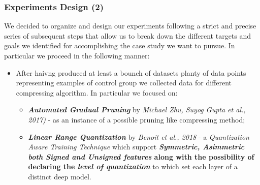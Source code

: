 



\begin{frame}
\frametitle{Experiments Design (2)}
We decided to organize and design our experiments following a strict and precise series of subsequent steps that allow us to break down the different targets and goals
we identified for accomplishing the case study we want to pursue. In particular we proceed in the following manner:

\begin{itemize}
\item After haivng produced at least a bounch of datasets planty of data points representing examples of control group we collected data for different compressing algorithm.
In particular we focused on:
\begin{itemize}
\item \textbf{\textit{Automated Gradual Pruning}} by \textit{Michael Zhu, Suyog Gupta et al., 2017)} - as an instance of a possible pruning like compressing method;
\item \textbf{\textit{Linear Range Quantization}} by \textit{ Benoit et al., 2018 } - a \textit{Quantization Aware Training Technique} which support \textbf{{\textit{Symmetric, Asimmetric both Signed and Unsigned features}}
along with the possibility of declaring the \textbf\textit{level of quantization}} to which set each layer of a distinct deep model.
\end{itemize}

\end{itemize}
\end{frame}